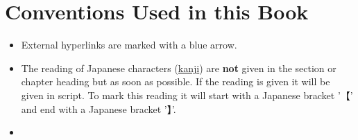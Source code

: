 \section*{Conventions Used in this Book}\label{sec:ConventionsUsesInThisBook}


\begin{itemize}

    \item[\Large\Link]

        External hyperlinks are marked with a blue arrow.


    \item[\Large\jhatsuon{\ldots}]

        The reading of Japanese characters (\hyperref[sec:Kanji]{kanji}) are
        \textbf{not} given in the section or chapter heading but as soon as
        possible. If the reading is given it will be given in
        \hyperref[sec:\jscript]{\jtopic} script. To mark this reading it will
        start with a Japanese bracket '{【}' and end with a Japanese bracket
        '{】}'.


        \medskip

    \item[\Large\jtl{\ldots}]


\end{itemize}
